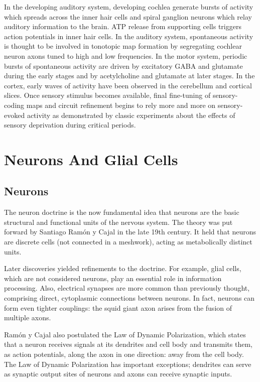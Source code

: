 \documentclass[]{book}
\begin{document}
In the developing auditory system, developing cochlea generate bursts of activity which spreads across the inner hair cells and spiral ganglion neurons which relay auditory information to the brain. ATP release from supporting cells triggers action potentials in inner hair cells. In the auditory system, spontaneous activity is thought to be involved in tonotopic map formation by segregating cochlear neuron axons tuned to high and low frequencies. In the motor system, periodic bursts of spontaneous activity are driven by excitatory GABA and glutamate during the early stages and by acetylcholine and glutamate at later stages. In the cortex, early waves of activity have been observed in the cerebellum and cortical slices. Once sensory stimulus becomes available, final fine-tuning of sensory-coding maps and circuit refinement begins to rely more and more on sensory-evoked activity as demonstrated by classic experiments about the effects of sensory deprivation during critical periods.

\hypertarget{neurons-and-glial-cells}{%
\chapter{Neurons And Glial Cells}\label{neurons-and-glial-cells}}

\hypertarget{neurons}{%
\section{Neurons}\label{neurons}}

The neuron doctrine is the now fundamental idea that neurons are the basic structural and functional units of the nervous system. The theory was put forward by Santiago Ramón y Cajal in the late 19th century. It held that neurons are discrete cells (not connected in a meshwork), acting as metabolically distinct units.

Later discoveries yielded refinements to the doctrine. For example, glial cells, which are not considered neurons, play an essential role in information processing. Also, electrical synapses are more common than previously thought, comprising direct, cytoplasmic connections between neurons. In fact, neurons can form even tighter couplings: the squid giant axon arises from the fusion of multiple axons.

Ramón y Cajal also postulated the Law of Dynamic Polarization, which states that a neuron receives signals at its dendrites and cell body and transmits them, as action potentials, along the axon in one direction: away from the cell body. The Law of Dynamic Polarization has important exceptions; dendrites can serve as synaptic output sites of neurons and axons can receive synaptic inputs.
\end{document}
